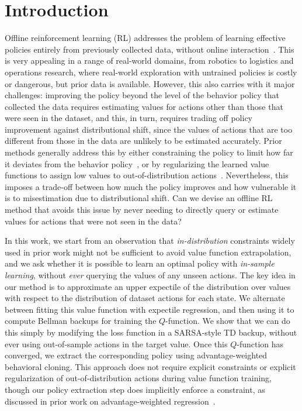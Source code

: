 \documentclass{article} %
\begin{document}
\section{Introduction}


Offline reinforcement learning (RL) addresses the problem of learning effective policies entirely from previously collected data, without online interaction~\citep{fujimoto2019off, lange2012batch}. This is very appealing in a range of real-world domains, from robotics to logistics and operations research, where real-world exploration with untrained policies is costly or dangerous, but prior data is available. However, this also carries with it major challenges: improving the policy beyond the level of the behavior policy that collected the data requires estimating values for actions other than those that were seen in the dataset, and this, in turn, requires trading off policy improvement against distributional shift, since the values of actions that are too different from those in the data are unlikely to be estimated accurately. Prior methods generally address this by either constraining the policy to limit how far it deviates from the behavior policy~\citep{fujimoto2019off, wu2019behavior, fujimoto2021minimalist, kumar2019stabilizing, nair2020awac, wang2020critic}, or by regularizing the learned value functions to assign low values to out-of-distribution actions~\citep{kumar2020conservative, kostrikov2021offline}. Nevertheless, this imposes a trade-off between how much the policy improves and how vulnerable it is to misestimation due to distributional shift. Can we devise an offline RL method that avoids this issue by never needing to directly query or estimate values for actions that were not seen in the data?


In this work, we start from an observation that \emph{in-distribution} constraints widely used in prior work might not be sufficient to avoid value function extrapolation, and we ask whether it is possible to learn an optimal policy with \emph{in-sample learning}, without \emph{ever} querying the values of any unseen actions.
The key idea in our method is to approximate an upper expectile of the distribution over values with respect to the distribution of dataset actions for each state. We alternate between fitting this value function with expectile regression, and then using it to compute Bellman backups for training the $Q$-function.
We show that we can do this simply by modifying the loss function in a SARSA-style TD backup, without ever using out-of-sample actions in the target value.
Once this $Q$-function has converged, we extract the corresponding policy using advantage-weighted behavioral cloning.
This approach does not require explicit constraints or explicit regularization of out-of-distribution actions during value function training, though our policy extraction step does implicitly enforce a constraint, as discussed in prior work on advantage-weighted regression~\citep{peters2007reinforcement, peng2019advantage, nair2020awac, wang2020critic}.
\end{document}
